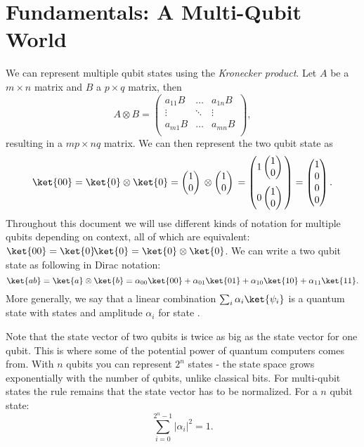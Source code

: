 \chapter{Fundamentals: A Multi-Qubit World}
We can represent multiple qubit states using the \emph{Kronecker product}. Let $A$ be a $m \times n$ matrix and $B$ a $p \times q$ matrix, then
\begin{equation}
  A \otimes B =
    \begin{pmatrix}
      a_{11}B & \dots & a_{1n}B \\
      \vdots & \ddots & \vdots \\
      a_{m1}B & \dots & a_{mn}B \\
    \end{pmatrix},
\end{equation}
resulting in a $mp \times nq$ matrix. We can then represent the two qubit state  as
\begin{equation}
  \ket{00} = \ket{0} \otimes \ket{0} = \qstatezero{} \otimes \qstatezero{} =
  \begin{pmatrix}
    1\qstatezero{} \\[13pt]
    0\qstatezero{}
  \end{pmatrix}
  =
  \begin{pmatrix}
    1 \\
    0 \\
    0 \\
    0
  \end{pmatrix}.
\end{equation}
Throughout this document we will use different kinds of notation for multiple qubits depending on context, all of which are equivalent: $\ket{00} = \ket{0}\!\ket{0} = \ket{0} \otimes \ket{0}$.
We can write a two qubit state as following in Dirac notation:
\begin{equation}
  \ket{ab} = \ket{a} \otimes \ket{b} = \alpha_{00}\ket{00} + \alpha_{01}\ket{01} + \alpha_{10}\ket{10} + \alpha_{11}\ket{11}.
\end{equation}
More generally, we say that a linear combination $\sum_{i} \alpha_i\ket{\psi_i}$ is a quantum state with states  and amplitude $\alpha_i$ for state .

Note that the state vector of two qubits is twice as big as the state vector for one qubit. This is where some of the potential power of quantum computers comes from. With $n$ qubits you can represent $2^n$ states - the state space grows exponentially with the number of qubits, unlike classical bits. For multi-qubit states the rule remains that the state vector has to be normalized. For a $n$ qubit state:
\begin{equation}
  \sum_{i = 0}^{2^n-1} |\alpha_i|^2 = 1.
\end{equation}

